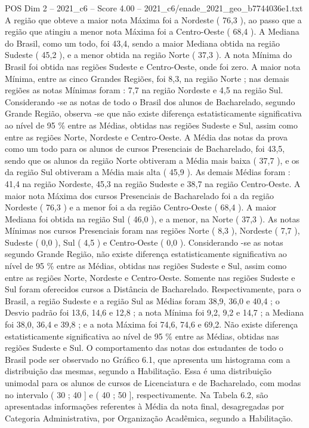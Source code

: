 \begin{textsample}{POS Dim 2 – 2021\_c6 – Score 4.00 – 2021\_c6/enade\_2021\_geo\_b7744036e1.txt}
A região que obteve a maior nota Máxima foi a Nordeste ( 76,3 ), ao passo que a região que atingiu a menor nota Máxima foi a Centro-Oeste ( 68,4 ).
A Mediana do Brasil, como um todo, foi 43,4, sendo a maior Mediana obtida na região Sudeste ( 45,2 ), e a menor obtida na região Norte ( 37,3 ).
A nota Mínima do Brasil foi obtida nas regiões Sudeste e Centro-Oeste, onde foi zero.
A maior nota Mínima, entre as cinco Grandes Regiões, foi 8,3, na região Norte ; nas demais regiões as notas Mínimas foram : 7,7 na região Nordeste e 4,5 na região Sul.
Considerando -se as notas de todo o Brasil dos alunos de Bacharelado, segundo Grande Região, observa -se que não existe diferença estatisticamente significativa ao nível de 95 \% entre as Médias, obtidas nas regiões Sudeste e Sul, assim como entre as regiões Norte, Nordeste e Centro-Oeste.
A Média das notas da prova como um todo para os alunos de cursos Presenciais de Bacharelado, foi 43,5, sendo que os alunos da região Norte obtiveram a Média mais baixa ( 37,7 ), e os da região Sul obtiveram a Média mais alta ( 45,9 ).
As demais Médias foram : 41,4 na região Nordeste, 45,3 na região Sudeste e 38,7 na região Centro-Oeste.
A maior nota Máxima dos cursos Presenciais de Bacharelado foi a da região Nordeste ( 76,3 ) e a menor foi a da região Centro-Oeste ( 68,4 ).
A maior Mediana foi obtida na região Sul ( 46,0 ), e a menor, na Norte ( 37,3 ).
As notas Mínimas nos cursos Presenciais foram nas regiões Norte ( 8,3 ), Nordeste ( 7,7 ), Sudeste ( 0,0 ), Sul ( 4,5 ) e Centro-Oeste ( 0,0 ).
Considerando -se as notas segundo Grande Região, não existe diferença estatisticamente significativa ao nível de 95 \% entre as Médias, obtidas nas regiões Sudeste e Sul, assim como entre as regiões Norte, Nordeste e Centro-Oeste.
Somente nas regiões Sudeste e Sul foram oferecidos cursos a Distância de Bacharelado.
Respectivamente, para o Brasil, a região Sudeste e a região Sul as Médias foram 38,9, 36,0 e 40,4 ; o Desvio padrão foi 13,6, 14,6 e 12,8 ; a nota Mínima foi 9,2, 9,2 e 14,7 ; a Mediana foi 38,0, 36,4 e 39,8 ; e a nota Máxima foi 74,6, 74,6 e 69,2.
Não existe diferença estatisticamente significativa ao nível de 95 \% entre as Médias, obtidas nas regiões Sudeste e Sul.
O comportamento das notas dos estudantes de todo o Brasil pode ser observado no Gráfico 6.1, que apresenta um histograma com a distribuição das mesmas, segundo a Habilitação.
Essa é uma distribuição unimodal para os alunos de cursos de Licenciatura e de Bacharelado, com modas no intervalo ( 30 ; 40 ] e ( 40 ; 50 ], respectivamente.
Na Tabela 6.2, são apresentadas informações referentes à Média da nota final, desagregadas por Categoria Administrativa, por Organização Acadêmica, segundo a Habilitação.

\end{textsample}

